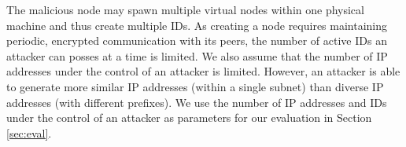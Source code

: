 The malicious node may spawn multiple virtual nodes within one physical machine and thus create multiple IDs. 
As creating a node requires maintaining periodic, encrypted communication with its peers, the number of active IDs an attacker can posses at a time is limited. 
We also assume that the number of IP addresses under the control of an attacker is limited. 
However, an attacker is able to generate more similar IP addresses (within a single subnet) than diverse IP addresses (with different prefixes). 
We use the number of IP addresses and IDs under the control of an attacker as parameters for our evaluation in Section \ref{sec:eval}.



